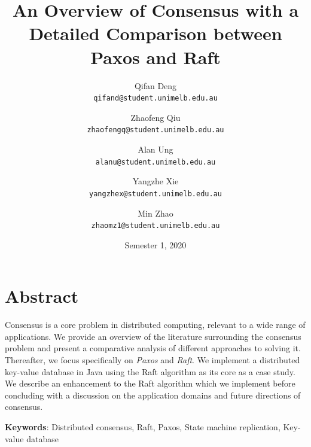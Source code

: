 \documentclass[12pt, a4paper]{article}
\title{{An Overview of Consensus with a Detailed Comparison between Paxos and Raft}}
\author{
  Qifan Deng \\
  \texttt{\small qifand@student.unimelb.edu.au}
  \and
  Zhaofeng Qiu \\
  \texttt{\small zhaofengq@student.unimelb.edu.au}
  \and
  Alan Ung \\
  \texttt{\small alanu@student.unimelb.edu.au}
  \and
  Yangzhe Xie \\
  \texttt{\small yangzhex@student.unimelb.edu.au}
  \and
  Min Zhao \\
  \texttt{\small zhaomz1@student.unimelb.edu.au}
}
\date{Semester 1, 2020}
\begin{document}
\maketitle
\thispagestyle{firststyle}


\section{Abstract}
Consensus is a core problem in distributed computing, relevant to a wide range of applications. We provide an overview of the literature surrounding the consensus problem and present a comparative analysis of different approaches to solving it. Thereafter, we focus specifically on \textit{Paxos} and \textit{Raft}. We implement a distributed key-value database in Java using the Raft algorithm as its core as a case study. We describe an enhancement to the Raft algorithm which we implement before concluding with a discussion on the application domains and future directions of consensus.



\textbf{Keywords}: Distributed consensus, Raft, Paxos, State machine replication, Key-value database
\end{document}
